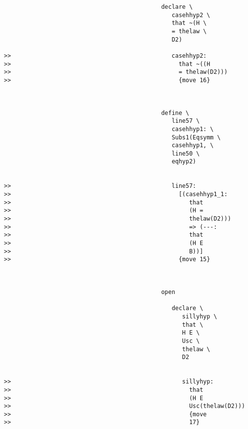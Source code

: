 \documentclass[12pt]{article}
\begin{document}
\begin{verbatim}
                                             declare \
                                                casehhyp2 \
                                                that ~(H \
                                                = thelaw \
                                                D2)

>>                                              casehhyp2:
>>                                                that ~((H
>>                                                = thelaw(D2)))
>>                                                {move 16}



                                             define \
                                                line57 \
                                                casehhyp1: \
                                                Subs1(Eqsymm \
                                                casehhyp1, \
                                                line50 \
                                                eqhyp2)


>>                                              line57:
>>                                                [(casehhyp1_1:
>>                                                   that
>>                                                   (H =
>>                                                   thelaw(D2)))
>>                                                   => (---:
>>                                                   that
>>                                                   (H E
>>                                                   B))]
>>                                                {move 15}



                                             open

                                                declare \
                                                   sillyhyp \
                                                   that \
                                                   H E \
                                                   Usc \
                                                   thelaw \
                                                   D2


>>                                                 sillyhyp:
>>                                                   that
>>                                                   (H E
>>                                                   Usc(thelaw(D2)))
>>                                                   {move
>>                                                   17}




\end{verbatim}
\end{document}
